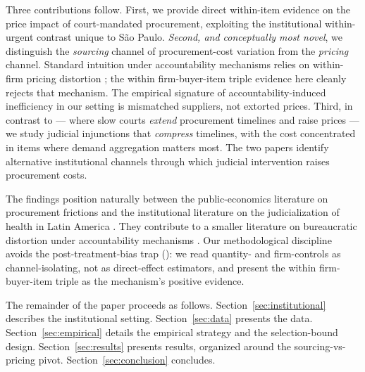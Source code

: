 Three contributions follow. First, we provide direct within-item
evidence on the price impact of court-mandated procurement, exploiting
the institutional within-urgent contrast unique to S\~ao Paulo.
\emph{Second, and conceptually most novel}, we distinguish the
\emph{sourcing} channel of procurement-cost variation from the
\emph{pricing} channel. Standard intuition under accountability
mechanisms relies on within-firm pricing distortion
\citep{prendergast2007bureaucrats}; the within firm-buyer-item triple
evidence here cleanly rejects that mechanism. The empirical signature of
accountability-induced inefficiency in our setting is mismatched
suppliers, not extorted prices. Third, in contrast to
\citet{coviello2018court} --- where slow courts \emph{extend} procurement
timelines and raise prices --- we study judicial injunctions that
\emph{compress} timelines, with the cost concentrated in items where
demand aggregation matters most. The two papers identify alternative
institutional channels through which judicial intervention raises
procurement costs.

The findings position naturally between the public-economics literature
on procurement frictions \citep{bandiera2009active, best2023procurement,
bosio2022public, decarolis2018buyer} and the institutional literature on
the judicialization of health in Latin America \citep{wang2015right,
ferraz2009right, biehl2009will}. They contribute to a smaller literature
on bureaucratic distortion under accountability mechanisms
\citep{rasul2018management, williams2021bureaucratic,
bandiera2021allocation}. Our methodological discipline avoids the
post-treatment-bias trap (\citealt{acharya2016explaining}): we read
quantity- and firm-controls as channel-isolating, not as direct-effect
estimators, and present the within firm-buyer-item triple as the
mechanism's positive evidence.

The remainder of the paper proceeds as follows.
Section~\ref{sec:institutional} describes the institutional setting.
Section~\ref{sec:data} presents the data. Section~\ref{sec:empirical}
details the empirical strategy and the selection-bound design.
Section~\ref{sec:results} presents results, organized around the
sourcing-vs-pricing pivot. Section~\ref{sec:conclusion} concludes.
